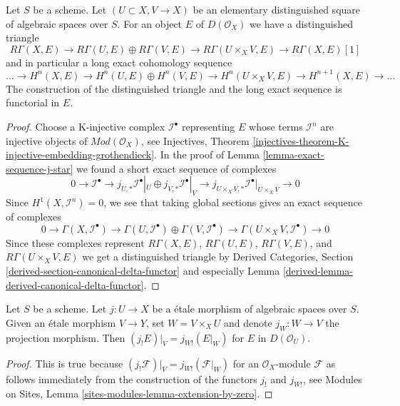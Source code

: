\begin{lemma}
\label{lemma-unbounded-mayer-vietoris}
Let $S$ be a scheme. Let $(U \subset X, V \to X)$ be an elementary
distinguished square of algebraic spaces over $S$. For an object $E$
of $D(\mathcal{O}_X)$ we have a distinguished triangle
$$
R\Gamma(X, E) \to R\Gamma(U, E) \oplus R\Gamma(V, E) \to
R\Gamma(U \times_X V, E) \to R\Gamma(X, E)[1]
$$
and in particular a long exact cohomology sequence
$$
\ldots \to
H^n(X, E) \to
H^n(U, E) \oplus H^n(V, E) \to
H^n(U \times_X V, E) \to
H^{n + 1}(X, E) \to \ldots
$$
The construction of the distinguished triangle and the
long exact sequence is functorial in $E$.
\end{lemma}

\begin{proof}
Choose a K-injective complex $\mathcal{I}^\bullet$ representing $E$
whose terms $\mathcal{I}^n$ are injective objects of
$\textit{Mod}(\mathcal{O}_X)$, see Injectives, Theorem
\ref{injectives-theorem-K-injective-embedding-grothendieck}.
In the proof of Lemma \ref{lemma-exact-sequence-j-star}
we found a short exact sequence
of complexes
$$
0 \to \mathcal{I}^\bullet \to
j_{U, *}\mathcal{I}^\bullet|_U \oplus j_{V, *}\mathcal{I}^\bullet|_V \to
j_{U \times_X V, *}\mathcal{I}^\bullet|_{U \times_X V} \to 0
$$
Since $H^1(X, \mathcal{I}^n) = 0$, we see that
taking global sections gives an exact sequence of complexes
$$
0 \to \Gamma(X, \mathcal{I}^\bullet) \to
\Gamma(U, \mathcal{I}^\bullet) \oplus
\Gamma(V, \mathcal{I}^\bullet) \to
\Gamma(U \times_X V, \mathcal{I}^\bullet) \to 0
$$
Since these complexes represent
$R\Gamma(X, E)$, $R\Gamma(U, E)$, $R\Gamma(V, E)$, and
$R\Gamma(U \times_X V, E)$ we 
get a distinguished triangle by
Derived Categories, Section
\ref{derived-section-canonical-delta-functor} and especially
Lemma \ref{derived-lemma-derived-canonical-delta-functor}.
\end{proof}

\begin{lemma}
\label{lemma-restrict-lower-shriek}
Let $S$ be a scheme. Let $j : U \to X$ be a \'etale morphism of algebraic
spaces over $S$. Given an \'etale morphism $V \to Y$, set $W = V \times_X U$
and denote $j_W : W \to V$ the projection morphism. Then
$(j_!E)|_V = j_{W!}(E|_W)$ for $E$ in $D(\mathcal{O}_U)$.
\end{lemma}

\begin{proof}
This is true because
$(j_!\mathcal{F})|_V = j_{W!}(\mathcal{F}|_W)$
for an $\mathcal{O}_X$-module $\mathcal{F}$ as follows immediately 
from the construction of the functors $j_!$ and $j_{W!}$, see
Modules on Sites, Lemma \ref{sites-modules-lemma-extension-by-zero}.
\end{proof}

